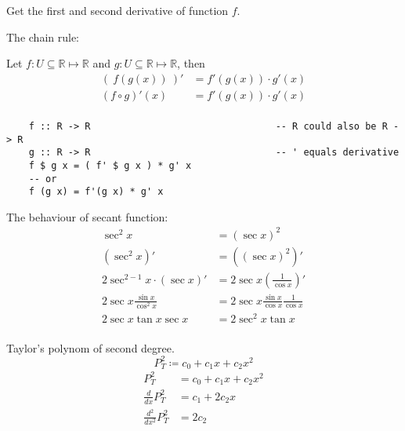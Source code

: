 Get the first and second derivative of function $f$.

The chain rule:
\begin{center}
    Let $f : U \subseteq \mathbb{R} \mapsto \mathbb{R}$ and 
    $g : U \subseteq \mathbb{R} \mapsto \mathbb{R}$, then
    \begin{align*}
        \left(\ f(g(x))\ \right)' &= f'(g(x)) \cdot g'(x) \\
        (f \circ g)'(x) &= f'(g(x)) \cdot g'(x) \\
    \end{align*}
\end{center}
\begin{lstlisting}
    f :: R -> R                                 -- R could also be R -> R 
    g :: R -> R                                 -- ' equals derivative
    f $ g x = ( f' $ g x ) * g' x               
    -- or
    f (g x) = f'(g x) * g' x               
\end{lstlisting} 

The behaviour of secant function:
\begin{align*}
    \sec^2{x} &= (\sec{x})^2 \\
    \left( \sec^2{x} \right)' &= \left( (\sec{x})^2 \right)' \\
    2\sec^{2 - 1}{x} \cdot \left( \sec{x} \right)'
    &= 2\sec{x} \left( \frac{1}{\cos{x}} \right)' \\
    2\sec{x} \frac{\sin{x}}{\cos^2{x}}
    &= 2\sec{x} \frac{\sin{x}}{\cos{x}} \frac{1}{\cos{x}} \\
    2\sec{x} \tan{x} \sec{x}
    &= 2\sec^2{x} \tan{x} \\
\end{align*}

Taylor's polynom of second degree.
$$ P^2_T \coloneq c_0 + c_1 x + c_2 x^2 $$
\begin{align*}
    P^2_T &= c_0 + c_1 x + c_2 x^2 \\
    \frac{d}{dx} P^{2}_T &= c_1 + 2 c_2 x \\
    \frac{d^2}{dx^2} P^{2}_T &= 2 c_2 \\
\end{align*}

